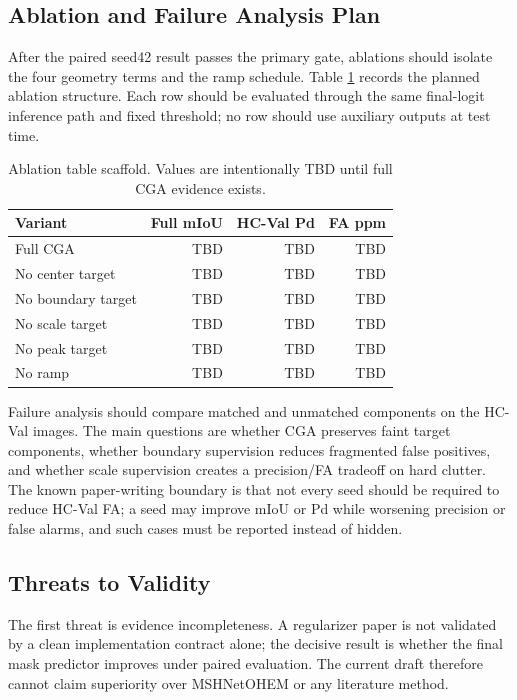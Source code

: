 \documentclass[letterpaper]{article}
\begin{document}
\subsection{Ablation and Failure Analysis Plan}

After the paired seed42 result passes the primary gate, ablations should isolate the four geometry terms and the ramp schedule. Table \ref{tab:ablation-plan} records the planned ablation structure. Each row should be evaluated through the same final-logit inference path and fixed threshold; no row should use auxiliary outputs at test time.

\begin{table}[t]
\centering
\caption{Ablation table scaffold. Values are intentionally TBD until full CGA evidence exists.}
\label{tab:ablation-plan}
\small
\begin{tabular}{lrrr}
\toprule
Variant & Full mIoU & HC-Val Pd & FA ppm \\
\midrule
Full CGA & TBD & TBD & TBD \\
No center target & TBD & TBD & TBD \\
No boundary target & TBD & TBD & TBD \\
No scale target & TBD & TBD & TBD \\
No peak target & TBD & TBD & TBD \\
No ramp & TBD & TBD & TBD \\
\bottomrule
\end{tabular}
\end{table}

Failure analysis should compare matched and unmatched components on the HC-Val images. The main questions are whether CGA preserves faint target components, whether boundary supervision reduces fragmented false positives, and whether scale supervision creates a precision/FA tradeoff on hard clutter. The known paper-writing boundary is that not every seed should be required to reduce HC-Val FA; a seed may improve mIoU or Pd while worsening precision or false alarms, and such cases must be reported instead of hidden.

\subsection{Threats to Validity}

The first threat is evidence incompleteness. A regularizer paper is not validated by a clean implementation contract alone; the decisive result is whether the final mask predictor improves under paired evaluation. The current draft therefore cannot claim superiority over MSHNetOHEM or any literature method.
\end{document}
